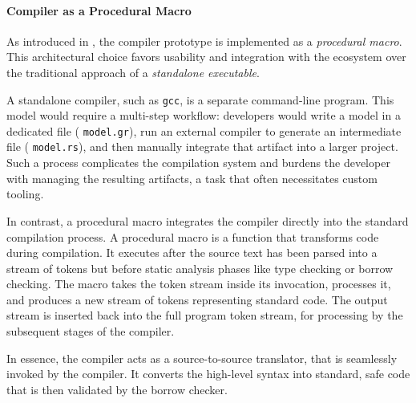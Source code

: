 \paragraph{Compiler as a Procedural Macro}

As introduced in , the \GRust compiler prototype is
implemented as a \Rust \emph{procedural macro}. This architectural choice favors usability and
integration with the \Rust ecosystem over the traditional approach of a \emph{standalone
    executable}.

A standalone compiler, such as \texttt{gcc}, is a separate command-line program. This model would
require a multi-step workflow: developers would write a \GRust model in a dedicated file (\eg
\texttt{model.gr}), run an external compiler to generate an intermediate \Rust file (\eg
\texttt{model.rs}), and then manually integrate that artifact into a larger \Rust project. Such a
process complicates the compilation system and burdens the developer with managing the resulting
artifacts, a task that often necessitates custom tooling.

In contrast, a procedural macro integrates the \GRust compiler directly into the standard \Rust
compilation process. A procedural macro is a function that transforms code during compilation. It
executes after the source text has been parsed into a stream of tokens but before static analysis
phases like type checking or borrow checking. The macro takes the token stream inside its
invocation, processes it, and produces a new stream of tokens representing standard \Rust code. The
output stream is inserted back into the full program token stream, for processing by the subsequent
stages of the \Rust compiler.

In essence, the \GRust compiler acts as a source-to-source translator, that is seamlessly invoked by
the \Rust compiler. It converts the high-level \GRust syntax into standard, safe \Rust code that is
then validated by the borrow checker.

